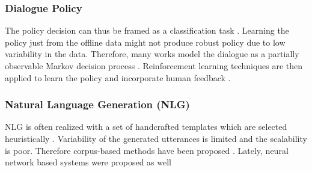 \subsubsection{Dialogue Policy}
\label{relwork:policy}
The policy decision can thus be framed as a classification task \cite{gavsic2013gaussian}.
Learning the policy just from the offline data might not produce robust policy due to low variability in the data.
Therefore, many works model the dialogue as a partially observable Markov decision process \cite{gavsic2010gaussian, thomson2010bayesian}.
Reinforcement learning techniques are then applied to learn the policy and incorporate human feedback \cite{peng2017composite, su2016line}.

\subsubsection{Natural Language Generation (NLG)}
NLG is often realized with a set of handcrafted templates which are selected heuristically \cite{rudnicky_creating_1999}.
Variability of the generated utterances is limited and the scalability is poor.
Therefore corpus-based methods have been proposed \cite{oh2000stochastic, mairesse-young-2014-stochastic}.
Lately, neural network based systems were proposed as well \cite{wen-etal-2015-semantically, wen-etal-2016-multi}

